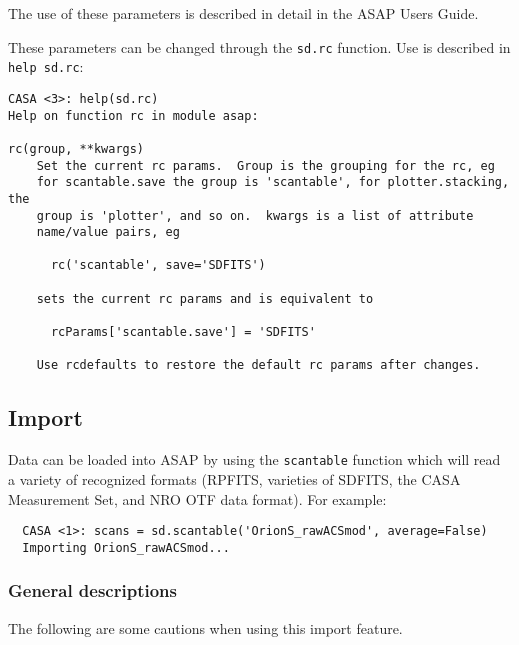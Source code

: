 The use of these parameters is described in detail in the
ASAP Users Guide.

These parameters can be changed through the {\tt sd.rc}
function.  Use is described in {\tt help sd.rc}:

\small
\begin{verbatim}
CASA <3>: help(sd.rc)
Help on function rc in module asap:

rc(group, **kwargs)
    Set the current rc params.  Group is the grouping for the rc, eg
    for scantable.save the group is 'scantable', for plotter.stacking, the
    group is 'plotter', and so on.  kwargs is a list of attribute
    name/value pairs, eg
    
      rc('scantable', save='SDFITS')
    
    sets the current rc params and is equivalent to
    
      rcParams['scantable.save'] = 'SDFITS'
    
    Use rcdefaults to restore the default rc params after changes.
\end{verbatim}
\normalsize

\subsection{Import}
\label{subsection:sd.asap.import}

Data can be loaded into ASAP by using the {\tt scantable} function
which will read a variety of recognized formats (RPFITS, varieties of
SDFITS, the CASA Measurement Set, and NRO OTF data format). For example:


\small
\begin{verbatim}
  CASA <1>: scans = sd.scantable('OrionS_rawACSmod', average=False)
  Importing OrionS_rawACSmod...
\end{verbatim}
\normalsize

\subsubsection{General descriptions}
\label{subsubsection:sd.asap.import.gen}

The following are some cautions when using this import feature.

